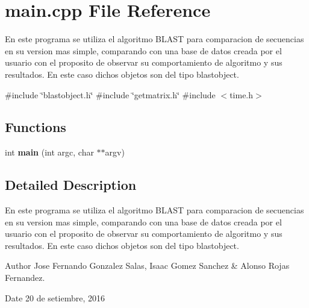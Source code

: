 \section{main.\+cpp File Reference}
\label{main_8cpp}


En este programa se utiliza el algoritmo B\+L\+A\+ST para comparacion de secuencias en su version mas simple, comparando con una base de datos creada por el usuario con el proposito de observar su comportamiento de algoritmo y sus resultados. En este caso dichos objetos son del tipo blastobject.  


{\ttfamily \#include \char`\"{}blastobject.\+h\char`\"{}}\newline
{\ttfamily \#include \char`\"{}getmatrix.\+h\char`\"{}}\newline
{\ttfamily \#include $<$time.\+h$>$}\newline
\subsection*{Functions}
\begin{DoxyCompactItemize}
\item 
\label{main_8cpp_a3c04138a5bfe5d72780bb7e82a18e627} 
int {\bfseries main} (int argc, char $\ast$$\ast$argv)
\end{DoxyCompactItemize}


\subsection{Detailed Description}
En este programa se utiliza el algoritmo B\+L\+A\+ST para comparacion de secuencias en su version mas simple, comparando con una base de datos creada por el usuario con el proposito de observar su comportamiento de algoritmo y sus resultados. En este caso dichos objetos son del tipo blastobject. 

\begin{DoxyAuthor}{Author}
Jose Fernando Gonzalez Salas, Isaac Gomez Sanchez \& Alonso Rojas Fernandez. 
\end{DoxyAuthor}
\begin{DoxyDate}{Date}
20 de setiembre, 2016 
\end{DoxyDate}
